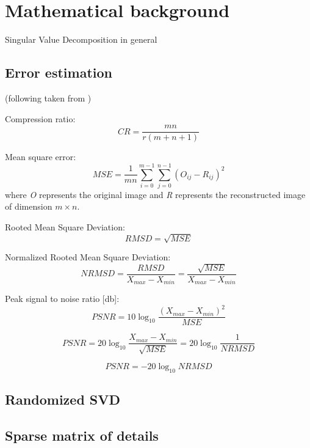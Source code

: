 \section{Mathematical background}
\label{section:math}

Singular Value Decomposition in general


\subsection{Error estimation}

(following taken from \cite{SairaBanu2015})

Compression ratio:
$$CR=\frac{m n}{r(m+n+1)}$$

Mean square error:
$$MSE=\frac{1}{m n} \sum_{i=0}^{m-1} \sum_{j=0}^{n-1} (O_{ij} - R_{ij})^{2}$$
where \textit{O} represents the original image and \textit{R} represents the
reconstructed image of dimension $m \times n$.

Rooted Mean Square Deviation:
$$RMSD=\sqrt{MSE}$$

Normalized Rooted Mean Square Deviation:
$$NRMSD=\frac{RMSD}{X_{max}-X_{min}}=\frac{\sqrt{MSE}}{X_{max}-X_{min}}$$

Peak signal to noise ratio [db]:
$$PSNR=10\log_{10}\frac{(X_{max}-X_{min})^{2}}{MSE}$$

$$PSNR=20\log_{10}\frac{X_{max}-X_{min}}{\sqrt{MSE}}=20\log_{10}\frac{1}{NRMSD}$$

$$PSNR=-20\log_{10}NRMSD$$

\subsection{Randomized SVD}

\subsection{Sparse matrix of details}